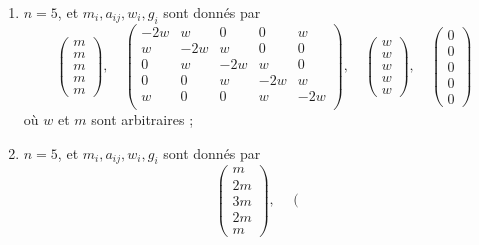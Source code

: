 \begin{lemma}[Genre un]
\begin{enumerate}
$$\begin{matrix}
2w \\
2w \\
2w \\
w
\end{matrix}
\right),
\quad
\left(
\begin{matrix}
0 \\
0 \\
0 \\
0
\end{matrix}
\right)
$$
où $w$ et $m$ sont arbitraires ;
\item
\label{item-five-cycle}
$n = 5$, et $m_i, a_{ij}, w_i, g_i$ sont donnés par
$$
\left(
\begin{matrix}
m \\
m \\
m \\
m \\
m
\end{matrix}
\right),
\quad
\left(
\begin{matrix}
-2w & w & 0 & 0 & w \\
w & -2w & w & 0 & 0 \\
0 & w & -2w & w & 0 \\
0 & 0 & w & -2w & w \\
w & 0 & 0 & w & -2w \\
\end{matrix}
\right),
\quad
\left(
\begin{matrix}
w \\
w \\
w \\
w \\
w
\end{matrix}
\right),
\quad
\left(
\begin{matrix}
0 \\
0 \\
0 \\
0 \\
0
\end{matrix}
\right)
$$
où $w$ et $m$ sont arbitraires ;
\item
\label{item-equal-equal-up-equal}
$n = 5$, et $m_i, a_{ij}, w_i, g_i$ sont donnés par
$$
\left(
\begin{matrix}
m \\
2m \\
3m \\
2m \\
m
\end{matrix}
\right),
\quad
\left(
\begin{matrix}

\end{matrix}$$
\end{enumerate}
\end{lemma}

